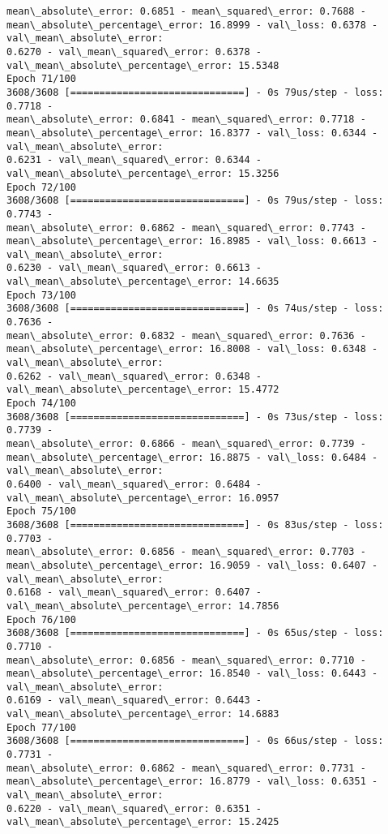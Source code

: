 \documentclass[11pt]{article}
\begin{document}
\begin{Verbatim}[commandchars=\\\{\},fontsize=\footnotesize]
mean\_absolute\_error: 0.6851 - mean\_squared\_error: 0.7688 -
mean\_absolute\_percentage\_error: 16.8999 - val\_loss: 0.6378 - val\_mean\_absolute\_error:
0.6270 - val\_mean\_squared\_error: 0.6378 - val\_mean\_absolute\_percentage\_error: 15.5348
Epoch 71/100
3608/3608 [==============================] - 0s 79us/step - loss: 0.7718 -
mean\_absolute\_error: 0.6841 - mean\_squared\_error: 0.7718 -
mean\_absolute\_percentage\_error: 16.8377 - val\_loss: 0.6344 - val\_mean\_absolute\_error:
0.6231 - val\_mean\_squared\_error: 0.6344 - val\_mean\_absolute\_percentage\_error: 15.3256
Epoch 72/100
3608/3608 [==============================] - 0s 79us/step - loss: 0.7743 -
mean\_absolute\_error: 0.6862 - mean\_squared\_error: 0.7743 -
mean\_absolute\_percentage\_error: 16.8985 - val\_loss: 0.6613 - val\_mean\_absolute\_error:
0.6230 - val\_mean\_squared\_error: 0.6613 - val\_mean\_absolute\_percentage\_error: 14.6635
Epoch 73/100
3608/3608 [==============================] - 0s 74us/step - loss: 0.7636 -
mean\_absolute\_error: 0.6832 - mean\_squared\_error: 0.7636 -
mean\_absolute\_percentage\_error: 16.8008 - val\_loss: 0.6348 - val\_mean\_absolute\_error:
0.6262 - val\_mean\_squared\_error: 0.6348 - val\_mean\_absolute\_percentage\_error: 15.4772
Epoch 74/100
3608/3608 [==============================] - 0s 73us/step - loss: 0.7739 -
mean\_absolute\_error: 0.6866 - mean\_squared\_error: 0.7739 -
mean\_absolute\_percentage\_error: 16.8875 - val\_loss: 0.6484 - val\_mean\_absolute\_error:
0.6400 - val\_mean\_squared\_error: 0.6484 - val\_mean\_absolute\_percentage\_error: 16.0957
Epoch 75/100
3608/3608 [==============================] - 0s 83us/step - loss: 0.7703 -
mean\_absolute\_error: 0.6856 - mean\_squared\_error: 0.7703 -
mean\_absolute\_percentage\_error: 16.9059 - val\_loss: 0.6407 - val\_mean\_absolute\_error:
0.6168 - val\_mean\_squared\_error: 0.6407 - val\_mean\_absolute\_percentage\_error: 14.7856
Epoch 76/100
3608/3608 [==============================] - 0s 65us/step - loss: 0.7710 -
mean\_absolute\_error: 0.6856 - mean\_squared\_error: 0.7710 -
mean\_absolute\_percentage\_error: 16.8540 - val\_loss: 0.6443 - val\_mean\_absolute\_error:
0.6169 - val\_mean\_squared\_error: 0.6443 - val\_mean\_absolute\_percentage\_error: 14.6883
Epoch 77/100
3608/3608 [==============================] - 0s 66us/step - loss: 0.7731 -
mean\_absolute\_error: 0.6862 - mean\_squared\_error: 0.7731 -
mean\_absolute\_percentage\_error: 16.8779 - val\_loss: 0.6351 - val\_mean\_absolute\_error:
0.6220 - val\_mean\_squared\_error: 0.6351 - val\_mean\_absolute\_percentage\_error: 15.2425

\end{Verbatim}
\end{document}
